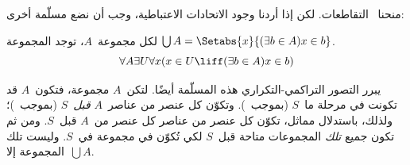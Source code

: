 \documentclass[../../../include/open-logic-section]{subfiles}
\begin{document}

منحنا~ التقاطعات. لكن إذا
أردنا وجود الاتحادات الاعتباطية، وجب أن نضع مسلّمة أخرى:

\begin{axiom}[الاتحاد] لكل مجموعة~$A$، توجد المجموعة
$\bigcup A = \Setabs{x}{(\exists b \in A) x \in b}$.
\[
	\forall A \exists U \forall x(x \in U \liff (\exists b \in A)x \in b)
\]
\end{axiom}

يبرر التصور التراكمي-التكراري هذه المسلّمة أيضًا. لتكن~$A$ مجموعة،
فتكون~$A$ قد تكونت في مرحلة ما~$S$ (بموجب~\stageshier). وتكوّن كل
عنصر من عناصر~$A$ \emph{قبل}~$S$ (بموجب~\stagesacc)؛ ولذلك، باستدلال
مماثل، تكوّن كل عنصر من عناصر كل عنصر من~$A$ قبل~$S$. ومن ثم تكون
جميع \emph{تلك} المجموعات متاحة قبل~$S$ لكي تُكوّن في مجموعة في~$S$.
وليست تلك المجموعة إلا~$\bigcup A$.
\end{document}

